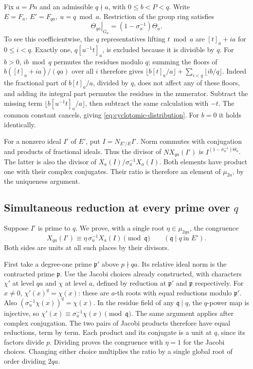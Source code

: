 Fix \(a=Pn\) and an admissible \(q\nmid a\), with \(0\le b<P<q\).
Write \(E=F_a,\ E'=F_{qa},\ u=q\bmod a\). Restriction of the group
ring satisfies
\begin{equation}
       \left.\Theta_{qa}\right|_{G_a}
                  =(1-\sigma_u^{-1})\Theta_a .
 \label{eq:cyclotomic-distribution}
\end{equation}
To see this coefficientwise, the \(q\) representatives lifting
\(t\bmod a\) are \([t]_a+ia\) for \(0\le i<q\). Exactly one,
\(q[u^{-1}t]_a\), is excluded because it is divisible by \(q\).
For \(b>0\), \(ib\bmod q\) permutes the residues modulo \(q\);
summing the floors of
\(b([t]_a+ia)/(qa)\) over all \(i\) therefore gives
\(\lfloor b[t]_a/a\rfloor+\sum_{i<q}\lfloor ib/q\rfloor\).
Indeed the fractional part of \(b[t]_a/a\), divided by \(q\),
does not affect any of these floors, and adding its integral
part permutes the residues in the numerator. Subtract the missing
term \(\lfloor b[u^{-1}t]_a/a\rfloor\), then subtract the same
calculation with \(-t\). The common constant cancels, giving
\eqref{eq:cyclotomic-distribution}. For \(b=0\) it holds identically.

For a nonzero ideal \(I'\) of \(E'\), put \(I=N_{E'/E}I'\).
Norm commutes with conjugation and products of fractional ideals.
Thus the divisor of \(N X_{qa}(I')\) is
\(I^{(1-\sigma_u^{-1})\Theta_a}\). The latter is also the divisor
of \(X_a(I)/\sigma_u^{-1}X_a(I)\). Both elements have product
one with their complex conjugates. Their ratio is therefore an
element of \(\mu_{2a}\), by the uniqueness argument.

\subsection{Simultaneous reduction at every prime over \(q\)}

Suppose \(I'\) is prime to \(q\). We prove, with a single root
\(\eta\in\mu_{2qa}\), the congruence
\[
          X_{qa}(I')\equiv\eta\,\sigma_u^{-1}X_a(I)
                       \pmod{\mathfrak q}
          \qquad(\mathfrak q\mid q\ \text{in }E').
\]
Both sides are units at all such places by their divisors.

First take a degree-one prime \(\mathfrak p'\) above \(p\nmid qa\).
Its relative ideal norm is the contracted prime \(\mathfrak p\).
Use the Jacobi choices already constructed, with characters
\(\chi'\) at level \(qa\) and \(\chi\) at level \(a\), defined by
reduction at \(\mathfrak p'\) and \(\mathfrak p\) respectively.
For \(x\ne0\), \(\chi'(x)^q=\chi(x)\): these are \(a\)-th roots
with equal reductions modulo \(\mathfrak p'\). Also
\((\sigma_u^{-1}\chi(x))^q=\chi(x)\). In the residue field of
any \(\mathfrak q\mid q\), the \(q\)-power map is injective, so
\(\chi'(x)\equiv\sigma_u^{-1}\chi(x)\pmod{\mathfrak q}\).
The same argument applies after complex conjugation. The two pairs
of Jacobi products therefore have equal reductions, term by term.
Each product and its conjugate is a unit at \(q\), since its
factors divide \(p\). Dividing proves the congruence with
\(\eta=1\) for the Jacobi choices. Changing either choice multiplies
the ratio by a single global root of order dividing \(2qa\).

